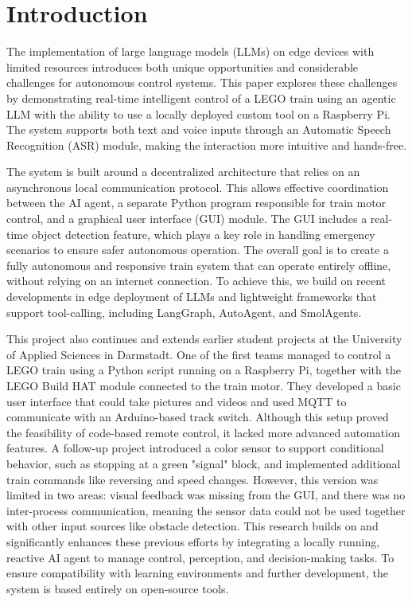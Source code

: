 \chapter{Introduction}
\label{ch:intro}


The implementation of large language models (LLMs) on edge devices with limited resources introduces both unique opportunities and considerable challenges for autonomous control systems. This paper explores these challenges by demonstrating real-time intelligent control of a LEGO train using an agentic LLM with the ability to use a locally deployed custom tool on a Raspberry Pi. The system supports both text and voice inputs through an Automatic Speech Recognition (ASR) module, making the interaction more intuitive and hands-free.

The system is built around a decentralized architecture that relies on an asynchronous local communication protocol. This allows effective coordination between the AI agent, a separate Python program responsible for train motor control, and a graphical user interface (GUI) module. The GUI includes a real-time object detection feature, which plays a key role in handling emergency scenarios to ensure safer autonomous operation. The overall goal is to create a fully autonomous and responsive train system that can operate entirely offline, without relying on an internet connection. To achieve this, we build on recent developments in edge deployment of LLMs and lightweight frameworks that support tool-calling, including LangGraph, AutoAgent, and SmolAgents.

This project also continues and extends earlier student projects at the University of Applied Sciences in Darmstadt. One of the first teams managed to control a LEGO train using a Python script running on a Raspberry Pi, together with the LEGO Build HAT module connected to the train motor. They developed a basic user interface that could take pictures and videos and used MQTT to communicate with an Arduino-based track switch. Although this setup proved the feasibility of code-based remote control, it lacked more advanced automation features. A follow-up project introduced a color sensor to support conditional behavior, such as stopping at a green "signal" block, and implemented additional train commands like reversing and speed changes. However, this version was limited in two areas: visual feedback was missing from the GUI, and there was no inter-process communication, meaning the sensor data could not be used together with other input sources like obstacle detection. This research builds on and significantly enhances these previous efforts by integrating a locally running, reactive AI agent to manage control, perception, and decision-making tasks. To ensure compatibility with learning environments and further development, the system is based entirely on open-source tools.


